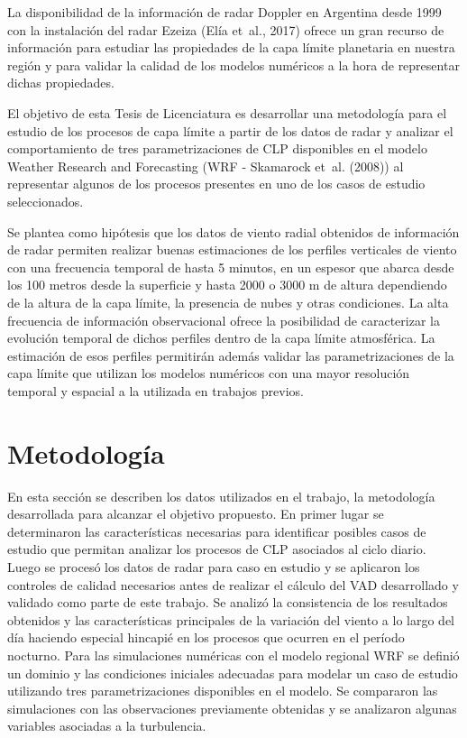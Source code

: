 \documentclass[12pt,spanish,oneside]{book}
\begin{document}
La disponibilidad de la información de radar Doppler en Argentina desde
1999 con la instalación del radar Ezeiza (Elía et~al., 2017) ofrece un
gran recurso de información para estudiar las propiedades de la capa
límite planetaria en nuestra región y para validar la calidad de los
modelos numéricos a la hora de representar dichas propiedades.

El objetivo de esta Tesis de Licenciatura es desarrollar una metodología
para el estudio de los procesos de capa límite a partir de los datos de
radar y analizar el comportamiento de tres parametrizaciones de CLP
disponibles en el modelo Weather Research and Forecasting (WRF -
Skamarock et~al. (2008)) al representar algunos de los procesos
presentes en uno de los casos de estudio seleccionados.

Se plantea como hipótesis que los datos de viento radial obtenidos de
información de radar permiten realizar buenas estimaciones de los
perfiles verticales de viento con una frecuencia temporal de hasta 5
minutos, en un espesor que abarca desde los 100 metros desde la
superficie y hasta 2000 o 3000 m de altura dependiendo de la altura de
la capa límite, la presencia de nubes y otras condiciones. La alta
frecuencia de información observacional ofrece la posibilidad de
caracterizar la evolución temporal de dichos perfiles dentro de la capa
límite atmosférica. La estimación de esos perfiles permitirán además
validar las parametrizaciones de la capa límite que utilizan los modelos
numéricos con una mayor resolución temporal y espacial a la utilizada en
trabajos previos.

\chapter{Metodología}\label{metodologia}

En esta sección se describen los datos utilizados en el trabajo, la
metodología desarrollada para alcanzar el objetivo propuesto. En primer
lugar se determinaron las características necesarias para identificar
posibles casos de estudio que permitan analizar los procesos de CLP
asociados al ciclo diario. Luego se procesó los datos de radar para caso
en estudio y se aplicaron los controles de calidad necesarios antes de
realizar el cálculo del VAD desarrollado y validado como parte de este
trabajo. Se analizó la consistencia de los resultados obtenidos y las
características principales de la variación del viento a lo largo del
día haciendo especial hincapié en los procesos que ocurren en el período
nocturno. Para las simulaciones numéricas con el modelo regional WRF se
definió un dominio y las condiciones iniciales adecuadas para modelar un
caso de estudio utilizando tres parametrizaciones disponibles en el
modelo. Se compararon las simulaciones con las observaciones previamente
obtenidas y se analizaron algunas variables asociadas a la turbulencia.
\end{document}
